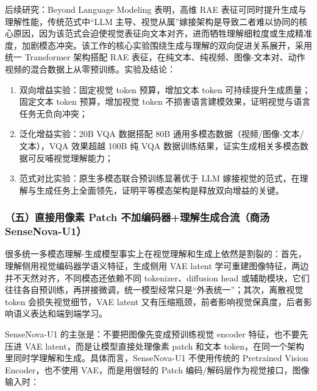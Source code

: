 后续研究：Beyond Language Modeling 表明，高维 RAE 表征可同时提升生成与理解性能，传统范式中``LLM 主导、视觉从属''嫁接架构是导致二者难以协同的核心原因，因为该范式会迫使视觉表征向文本对齐，进而牺牲理解细粒度或生成精准度，加剧模态冲突。该工作的核心实验围绕生成与理解的双向促进关系展开，采用统一 Transformer 架构搭配 RAE 表征，在纯文本、纯视频、图像-文本对、动作视频的混合数据上从零预训练。实验及结论：

\begin{enumerate}
\def\labelenumi{\arabic{enumi}.}
\tightlist
\item
  双向增益实验：固定视觉 token 预算，增加文本 token 可持续提升生成质量；固定文本 token 预算，增加视觉 token 不损害语言建模效果，证明视觉与语言任务无负向冲突；
\item
  泛化增益实验：20B VQA 数据搭配 80B 通用多模态数据（视频/图像-文本/文本），VQA 效果超越 100B 纯 VQA 数据训练结果，证实生成相关多模态数据可反哺视觉理解能力；
\item
  范式对比实验：原生多模态联合预训练显著优于 LLM 嫁接视觉的范式，在理解与生成任务上全面领先，证明平等模态架构是释放双向增益的关键。
\end{enumerate}

\hypertarget{ux4e94ux76f4ux63a5ux7528ux50cfux7d20-patch-ux4e0dux52a0ux7f16ux7801ux5668ux7406ux89e3ux751fux6210ux5408ux6d41ux5546ux6c64-sensenova-u1}{%
\subsubsection{（五）直接用像素 Patch 不加编码器+理解生成合流（商汤 SenseNova-U1）}\label{ux4e94ux76f4ux63a5ux7528ux50cfux7d20-patch-ux4e0dux52a0ux7f16ux7801ux5668ux7406ux89e3ux751fux6210ux5408ux6d41ux5546ux6c64-sensenova-u1}}

很多统一多模态理解-生成模型事实上在视觉理解和生成上依然是割裂的：首先，理解侧用视觉编码器学语义特征，生成侧用 VAE latent 学可重建图像特征，两边并不天然对齐，不同模态还依赖不同 tokenizer、diffusion head 或辅助模块，它们往往各自预训练，再拼接微调，统一模型经常只是``外表统一''；其次，离散视觉 token 会损失视觉细节，VAE latent 又有压缩瓶颈，前者影响视觉保真度，后者影响语义表达和端到端学习。

SenseNova-U1 的主张是：不要把图像先变成预训练视觉 encoder 特征，也不要先压进 VAE latent，而是让模型直接处理像素 patch 和文本 token，在同一个架构里同时学理解和生成。具体而言，SenseNova-U1 不使用传统的 Pretrained Vision Encoder，也不使用 VAE，而是用很轻的 Patch 编码/解码层作为视觉接口，图像输入时：

